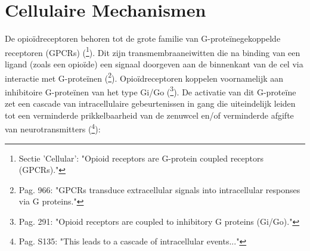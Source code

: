 \documentclass[11pt, a4paper]{report} %
\begin{document}
\section{Cellulaire Mechanismen}
De opioïdreceptoren behoren tot de grote familie van G-proteïnegekoppelde receptoren (GPCRs) (\cite{StatPearlsOpioidReceptor}\footnote{Sectie 'Cellular': "Opioid receptors are G-protein coupled receptors (GPCRs)."}). Dit zijn transmembraaneiwitten die na binding van een ligand (zoals een opioïde) een signaal doorgeven aan de binnenkant van de cel via interactie met G-proteïnen (\cite{Shang2020MolecularBasis}\footnote{Pag. 966: "GPCRs transduce extracellular signals into intracellular responses via G proteins."}). Opioïdreceptoren koppelen voornamelijk aan inhibitoire G-proteïnen van het type Gi/Go (\cite{Gupta2010ChemistryOpioids}\footnote{Pag. 291: "Opioid receptors are coupled to inhibitory G proteins (Gi/Go)."}). De activatie van dit G-proteïne zet een cascade van intracellulaire gebeurtenissen in gang die uiteindelijk leiden tot een verminderde prikkelbaarheid van de zenuwcel en/of verminderde afgifte van neurotransmitters (\cite{Trescot2008OpioidPharm}\footnote{Pag. S135: "This leads to a cascade of intracellular events..."}):
\end{document}
